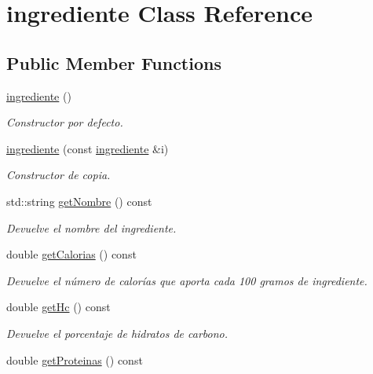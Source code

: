 \hypertarget{classingrediente}{}\section{ingrediente Class Reference}
\label{classingrediente}
\subsection*{Public Member Functions}
\begin{DoxyCompactItemize}
\item 
\mbox{\label{classingrediente_a4f2c8e16106eb4cf5a8ad9695d7a3809}} 
\hyperlink{classingrediente_a4f2c8e16106eb4cf5a8ad9695d7a3809}{ingrediente} ()
\begin{DoxyCompactList}\small\item\em Constructor por defecto. \end{DoxyCompactList}\item 
\hyperlink{classingrediente_a2a0a1afbd9b6a73e3d6857cdf42852a4}{ingrediente} (const \hyperlink{classingrediente}{ingrediente} \&i)
\begin{DoxyCompactList}\small\item\em Constructor de copia. \end{DoxyCompactList}\item 
std\+::string \hyperlink{classingrediente_a5be2c0a0987c5e5940c44abb9135a978}{get\+Nombre} () const
\begin{DoxyCompactList}\small\item\em Devuelve el nombre del ingrediente. \end{DoxyCompactList}\item 
double \hyperlink{classingrediente_ab61ade959dac30f2e025b806531d34cd}{get\+Calorias} () const
\begin{DoxyCompactList}\small\item\em Devuelve el número de calorías que aporta cada 100 gramos de ingrediente. \end{DoxyCompactList}\item 
double \hyperlink{classingrediente_ae51c33e37001b7807a7b2d7bd7352355}{get\+Hc} () const
\begin{DoxyCompactList}\small\item\em Devuelve el porcentaje de hidratos de carbono. \end{DoxyCompactList}\item 
double \hyperlink{classingrediente_a2506bbdfd9accd7247d1734838713d73}{get\+Proteinas} () const

\end{DoxyCompactItemize}
